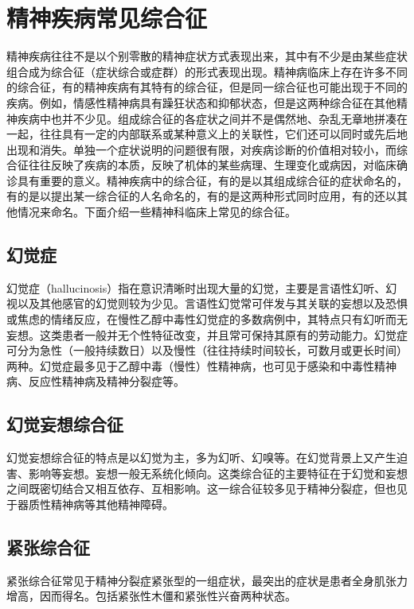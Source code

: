 \section{精神疾病常见综合征}

精神疾病往往不是以个别零散的精神症状方式表现出来，其中有不少是由某些症状组合成为综合征（症状综合或症群）的形式表现出现。精神病临床上存在许多不同的综合征，有的精神疾病有其特有的综合征，但是同一综合征也可能出现于不同的疾病。例如，情感性精神病具有躁狂状态和抑郁状态，但是这两种综合征在其他精神疾病中也并不少见。组成综合征的各症状之间并不是偶然地、杂乱无章地拼凑在一起，往往具有一定的内部联系或某种意义上的关联性，它们还可以同时或先后地出现和消失。单独一个症状说明的问题很有限，对疾病诊断的价值相对较小，而综合征往往反映了疾病的本质，反映了机体的某些病理、生理变化或病因，对临床确诊具有重要的意义。精神疾病中的综合征，有的是以其组成综合征的症状命名的，有的是以提出某一综合征的人名命名的，有的是这两种形式同时应用，有的还以其他情况来命名。下面介绍一些精神科临床上常见的综合征。

\subsection{幻觉症}

幻觉症（hallucinosis）指在意识清晰时出现大量的幻觉，主要是言语性幻听、幻视以及其他感官的幻觉则较为少见。言语性幻觉常可伴发与其关联的妄想以及恐惧或焦虑的情绪反应，在慢性乙醇中毒性幻觉症的多数病例中，其特点只有幻听而无妄想。这类患者一般并无个性特征改变，并且常可保持其原有的劳动能力。幻觉症可分为急性（一般持续数日）以及慢性（往往持续时间较长，可数月或更长时间）两种。幻觉症最多见于乙醇中毒（慢性）性精神病，也可见于感染和中毒性精神病、反应性精神病及精神分裂症等。

\subsection{幻觉妄想综合征}

幻觉妄想综合征的特点是以幻觉为主，多为幻听、幻嗅等。在幻觉背景上又产生迫害、影响等妄想。妄想一般无系统化倾向。这类综合征的主要特征在于幻觉和妄想之间既密切结合又相互依存、互相影响。这一综合征较多见于精神分裂症，但也见于器质性精神病等其他精神障碍。

\subsection{紧张综合征}

紧张综合征常见于精神分裂症紧张型的一组症状，最突出的症状是患者全身肌张力增高，因而得名。包括紧张性木僵和紧张性兴奋两种状态。

